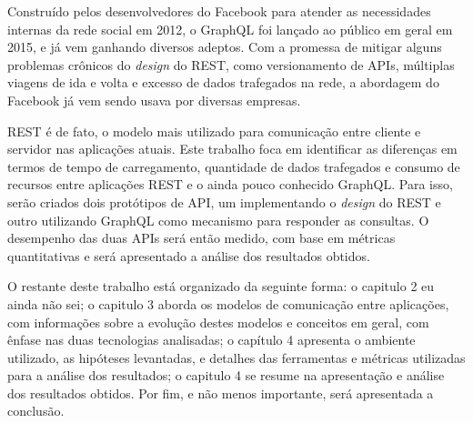 Construído pelos desenvolvedores do Facebook para atender as necessidades internas da rede social em 2012, o GraphQL foi lançado ao público em geral em 2015, e já vem ganhando diversos adeptos. Com a promessa de mitigar alguns problemas crônicos do \textit{design} do REST, como versionamento de APIs, múltiplas viagens de ida e volta e excesso de dados trafegados na rede, a abordagem do Facebook já vem sendo usava por diversas empresas.

REST é de fato, o modelo mais utilizado para comunicação entre cliente e servidor nas aplicações atuais. Este trabalho foca em identificar as diferenças em termos de tempo de carregamento, quantidade de dados trafegados e consumo de recursos entre aplicações REST e o ainda pouco conhecido GraphQL. Para isso, serão criados dois protótipos de API, um implementando o \textit{design} do REST e outro utilizando GraphQL como mecanismo para responder as consultas. O desempenho das duas APIs será então medido, com base em métricas quantitativas e será apresentado a análise dos resultados obtidos.

O restante deste trabalho está organizado da seguinte forma: o capitulo 2 eu ainda não sei; o capitulo 3 aborda os modelos de comunicação entre aplicações, com informações sobre a evolução destes modelos e conceitos em geral, com ênfase nas duas tecnologias analisadas; o capítulo 4 apresenta o ambiente utilizado, as hipóteses levantadas, e detalhes das ferramentas e métricas utilizadas para a análise dos resultados; o capitulo 4 se resume na apresentação e análise dos resultados obtidos. Por fim, e não menos importante, será apresentada a conclusão.